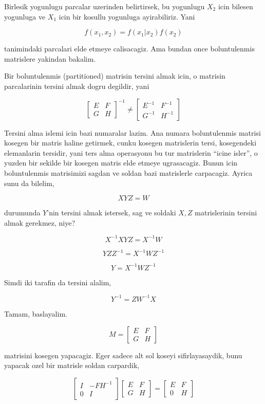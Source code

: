 \documentclass[12pt,fleqn]{article}\usepackage{../common}
\begin{document}
Birlesik yogunlugu parcalar uzerinden belirtirsek, bu yogunlugu $X_2$ icin
bilesen yogunluga ve $X_1$ icin bir kosullu yogunluga ayirabiliriz. Yani 

\[ f(x_1,x_2) = f(x_1|x_2) f(x_2) \]

tanimindaki parcalari elde etmeye calisacagiz.  Ama bundan once
boluntulenmis matrislere yakindan bakalim. 

Bir boluntulenmis (partitioned) matrisin tersini almak icin, o matrisin
parcalarinin tersini almak dogru degildir, yani

\[ 
\left[\begin{array}{rr}
E & F \\
G & H
\end{array}\right] ^{-1} \ne
\left[\begin{array}{rr}
E^{-1} & F ^{-1}\\
G^{-1} & H^{-1}
\end{array}\right]  
 \]

Tersini alma islemi icin bazi numaralar lazim. Ana numara boluntulenmis matrisi 
kosegen bir matris haline getirmek, cunku kosegen matrislerin tersi,
kosegendeki elemanlarin tersidir, yani ters alma operasyonu bu tur
matrislerin ``icine isler'', o yuzden bir sekilde bir kosegen matris
elde etmeye ugrasacagiz. Bunun icin boluntulenmis matrisimizi sagdan ve
soldan bazi matrislerle carpacagiz. Ayrica sunu da bilelim, 

\[ XYZ = W \]

durumunda $Y$'nin tersini almak istersek, sag ve soldaki $X,Z$
matrislerinin tersini almak gerekmez, niye?

\[ X^{-1}XYZ = X^{-1}W \]

\[ YZZ^{-1} = X^{-1}WZ^{-1} \]

\[ Y = X^{-1}WZ^{-1} \]

Simdi iki tarafin da tersini alalim, 

\[ Y^{-1} = ZW^{-1}X \]

Tamam, baslayalim. 

\[ M = 
\left[\begin{array}{rr}
E & F \\
G & H
\end{array}\right] 
 \]

matrisini kosegen yapacagiz. Eger sadece alt sol koseyi sifirlayasaydik, 
bunu yapacak ozel bir matrisle soldan carpardik,

\[ 
\left[\begin{array}{rr}
I & -FH^{-1} \\
0 & I
\end{array}\right] 
\left[\begin{array}{rr}
E & F \\
G & H
\end{array}\right] = 
\left[\begin{array}{rr}
E & F \\
0 & H
\end{array}\right] 
 \]
\end{document}
